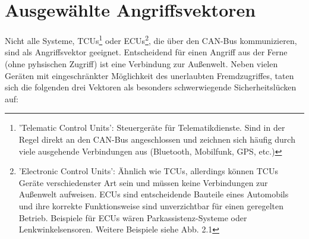 \documentclass[
    fontsize=12pt,
    headings=small,
    parskip=half,           %
    bibliography=totoc,9
    numbers=noenddot,       %
    open=any,               %
    ]{scrreprt}
\begin{document}
\section{Ausgewählte Angriffsvektoren}
Nicht alle Systeme, TCUs\footnote{'Telematic Control Units': Steuergeräte für Telematikdienste. Sind in der Regel direkt an den CAN-Bus angeschlossen und zeichnen sich häufig durch viele ausgehende Verbindungen aus (Bluetooth, Mobilfunk, GPS, etc.)} oder ECUs\footnote{'Electronic Control Units': Ähnlich wie TCUs, allerdings können TCUs Geräte verschiedenster Art sein und müssen keine Verbindungen zur Außenwelt aufweisen. ECUs sind entscheidende Bauteile eines Automobils und ihre korrekte Funktionsweise sind unverzichtbar für einen geregelten Betrieb. Beispiele für ECUs wären Parkassistenz-Systeme oder Lenkwinkelsensoren. Weitere Beispiele siehe Abb. 2.1}, die über den CAN-Bus kommunizieren, sind als Angriffsvektor geeignet. Entscheidend für einen Angriff aus der Ferne (ohne pyhsischen Zugriff) ist eine Verbindung zur Außenwelt. Neben vielen Geräten mit eingeschränkter Möglichkeit des unerlaubten Fremdzugriffes, taten sich die folgenden drei Vektoren als besonders schwerwiegende Sicherheitslücken auf:
\end{document}
